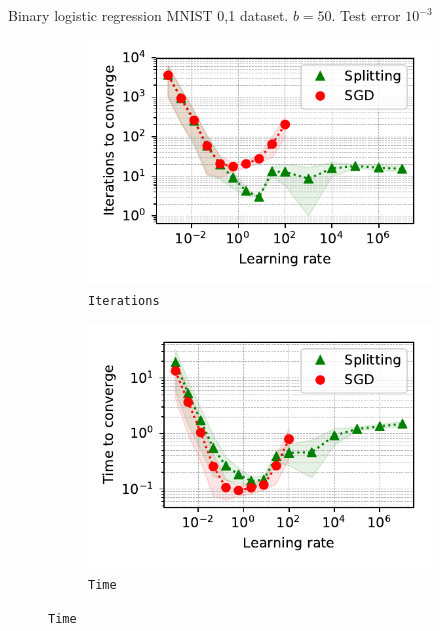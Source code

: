\documentclass[aspectratio=169]{beamer}
\begin{document}
\begin{frame}{Binary logistic regression}
MNIST 0,1 dataset. $b = 50$. Test error $10^{-3}$
\begin{figure}
    \begin{subfigure}[b]{0.5\textwidth}
            \centering
            \includegraphics[width=\linewidth]{Logreg_iter.pdf}
            \vspace{-25pt}
            \caption{{\small \texttt{Iterations}}}
            \vspace{-22pt}
    \end{subfigure}%
    \begin{subfigure}[b]{0.5\textwidth}
            \centering
            \includegraphics[width=\linewidth]{Logreg_time.pdf}
            \vspace{-25pt}
            \caption{{\small \texttt{Time}}}
            \vspace{-22pt}
    \end{subfigure}%
\end{figure}
\end{frame}
\end{document}
